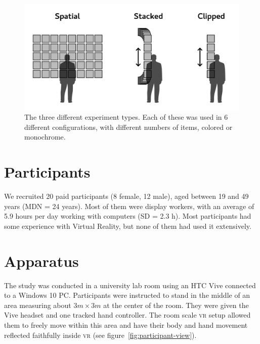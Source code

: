 \documentclass[nobib]{tufte-book} %
\begin{document}
\begin{figure}
  \includegraphics{types.png}
  \caption{The three different experiment types. Each of these was used in 6 different configurations, with different numbers of items, colored or monochrome.}
  \label{fig:experiment-types}
\end{figure}

\section{Participants}
We recruited 20 paid participants (8 female, 12 male), aged between 19 and 49 years (MDN = 24 years). Most of them were display workers, with an average of 5.9 hours per day working with computers (SD = 2.3 h). Most participants had some experience with Virtual Reality, but none of them had used it extensively.

\section{Apparatus}
The study was conducted in a university lab room using an HTC Vive connected to a Windows 10 PC. Participants were instructed to stand in the middle of an area measuring about $3m \times 3m$ at the center of the room. They were given the Vive headset and one tracked hand controller. The room scale \textsc{vr} setup allowed them to freely move within this area and have their body and hand movement reflected faithfully inside \textsc{vr} (see figure~\ref{fig:participant-view}).
\end{document}
